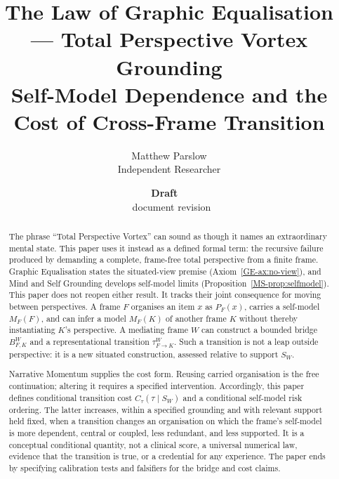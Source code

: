 \documentclass[11pt,a4paper]{article}
\title{The Law of Graphic Equalisation --- Total Perspective Vortex Grounding\\\large Self-Model Dependence and the Cost of Cross-Frame Transition}
\author{Matthew Parslow\\Independent Researcher}
\date{\textbf{Draft \texorpdfstring{\textemdash}{---}\ \PaperDraft}\\[2pt]\PaperDisplayDate \texorpdfstring{\textbullet}{\textperiodcentered}\ document revision \PaperRevision}
\theoremstyle{remark}
\begin{document}
\maketitle
\begin{center}
\end{center}
\vspace{1em}

\begin{abstract}
The phrase ``Total Perspective Vortex'' can sound as though it names an
extraordinary mental state. This paper uses it instead as a defined formal term:
the recursive failure produced by demanding a complete, frame-free total
perspective from a finite frame. Graphic Equalisation states the situated-view premise (Axiom~\ref{GE-ax:no-view}), and Mind and Self Grounding develops self-model limits (Proposition~\ref{MS-prop:selfmodel}). This paper does not reopen either result. It
tracks their joint consequence for moving between perspectives. A frame $F$
organises an item $x$ as $P_F(x)$, carries a self-model $M_F(F)$, and can infer a
model $M_F(K)$ of another frame $K$ without thereby instantiating $K$'s
perspective. A mediating frame $W$ can construct a bounded bridge $B^W_{F,K}$
and a representational transition $\tau^W_{F\to K}$. Such a transition is not a
leap outside perspective: it is a new situated construction, assessed relative
to support $S_W$.

Narrative Momentum supplies the cost form. Reusing carried organisation is the
free continuation; altering it requires a specified intervention. Accordingly,
this paper defines conditional transition cost
$C_\tau(\tau\mid S_W)$ and a conditional self-model risk ordering. The latter
increases, within a specified grounding and with relevant support held fixed,
when a transition changes an organisation on which the frame's self-model is
more dependent, central or coupled, less redundant, and less supported. It is a
conceptual conditional quantity, not a clinical score, a universal numerical
law, evidence that the transition is true, or a credential for any experience.
The paper ends by specifying calibration tests and falsifiers for the bridge and
cost claims.
\end{abstract}
\end{document}
